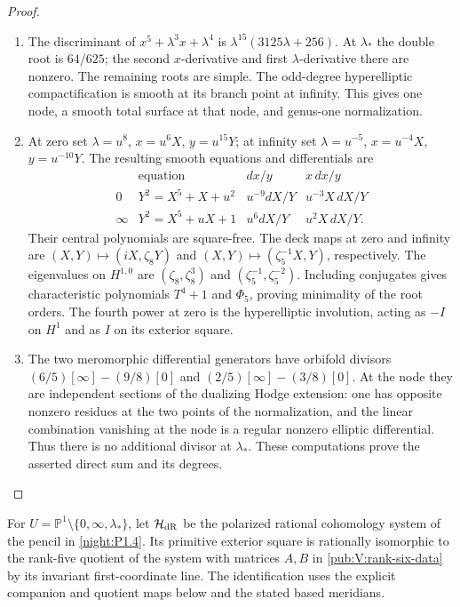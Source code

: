 \begin{proof}
\begin{enumerate}[label={$\langle1\rangle$\arabic*.}]
\item The discriminant of $x^5+\lambda^3x+\lambda^4$ is
$\lambda^{15}(3125\lambda+256)$.
At $\lambda_*$ the double root is $64/625$;
the second $x$-derivative and first $\lambda$-derivative there are
nonzero.  The remaining roots are simple.  The odd-degree
hyperelliptic compactification is smooth at its branch point at
infinity.  This gives one node, a smooth total surface at that node,
and genus-one normalization.

\item At zero set $\lambda=u^8$, $x=u^6X$, $y=u^{15}Y$; at infinity set
$\lambda=u^{-5}$, $x=u^{-4}X$, $y=u^{-10}Y$.
The resulting smooth equations and differentials are
\[
\begin{array}{c|c|c|c}
 &\text{equation}&dx/y&x\,dx/y\\\hline
0&Y^2=X^5+X+u^2&u^{-9}dX/Y&u^{-3}X\,dX/Y\\
\infty&Y^2=X^5+uX+1&u^6dX/Y&u^2X\,dX/Y.
\end{array}
\]
Their central polynomials are square-free.  The deck maps at zero and
infinity are $(X,Y)\mapsto(iX,\zeta_8Y)$ and
$(X,Y)\mapsto(\zeta_5^{-1}X,Y)$, respectively.
The eigenvalues on $H^{1,0}$ are $(\zeta_8,\zeta_8^3)$ and
$(\zeta_5^{-1},\zeta_5^{-2})$.  Including conjugates gives characteristic
polynomials $T^4+1$ and $\Phi_5$, proving minimality of the root orders.
The fourth power at zero is the hyperelliptic involution, acting as
$-I$ on $H^1$ and as $I$ on its exterior square.

\item The two meromorphic differential generators have orbifold divisors
$(6/5)[\infty]-(9/8)[0]$ and
$(2/5)[\infty]-(3/8)[0]$.
At the node they are independent sections of the dualizing Hodge
extension: one has opposite nonzero residues at the two points of the
normalization, and the linear combination vanishing at the node is a
regular nonzero elliptic differential.  Thus there is no additional
divisor at $\lambda_*$.  These computations prove the asserted direct
sum and its degrees.

\end{enumerate}
\end{proof}









\begin{theorem}\hypertarget{tag-02O7}{}\label{maps:src:F.3.5}


For $U=\mathbb P^1\setminus\{0,\infty,\lambda_*\}$, let
$\mathcal H_{\rm dR}$ be the polarized rational cohomology system
of the pencil in \cref{night:P1.4}. Its primitive exterior square
is rationally isomorphic to the rank-five quotient of the system
with matrices $A,B$ in \cref{pub:V:rank-six-data} by its invariant
first-coordinate line. The identification uses the explicit
companion and quotient maps below and the stated based meridians.
\end{theorem}


